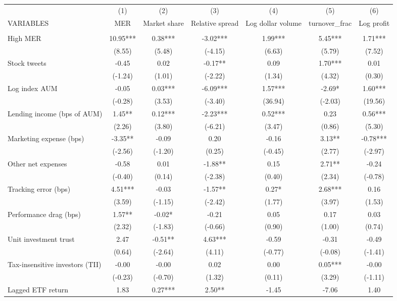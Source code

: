 \documentclass[]{article}
\begin{document}
\begin{tabular}{lcccccc} \hline
 & (1) & (2) & (3) & (4) & (5) & (6) \\
VARIABLES & MER & Market share & Relative spread & Log dollar volume & turnover\_frac & Log profit \\ \hline
 &  &  &  &  &  &  \\
High MER & 10.95*** & 0.38*** & -3.02*** & 1.99*** & 5.45*** & 1.71*** \\
 & (8.55) & (5.48) & (-4.15) & (6.63) & (5.79) & (7.52) \\
Stock tweets & -0.45 & 0.02 & -0.17** & 0.09 & 1.70*** & 0.01 \\
 & (-1.24) & (1.01) & (-2.22) & (1.34) & (4.32) & (0.30) \\
Log index AUM & -0.05 & 0.03*** & -6.09*** & 1.57*** & -2.69* & 1.60*** \\
 & (-0.28) & (3.53) & (-3.40) & (36.94) & (-2.03) & (19.56) \\
Lending income (bps of AUM) & 1.45** & 0.12*** & -2.23*** & 0.52*** & 0.23 & 0.56*** \\
 & (2.26) & (3.80) & (-6.21) & (3.47) & (0.86) & (5.30) \\
Marketing expense (bps) & -3.35** & -0.09 & 0.20 & -0.16 & 3.13** & -0.78*** \\
 & (-2.56) & (-1.20) & (0.25) & (-0.45) & (2.77) & (-2.97) \\
Other net expenses & -0.58 & 0.01 & -1.88** & 0.15 & 2.71** & -0.24 \\
 & (-0.40) & (0.14) & (-2.38) & (0.40) & (2.34) & (-0.78) \\
Tracking error (bps) & 4.51*** & -0.03 & -1.57** & 0.27* & 2.68*** & 0.16 \\
 & (3.59) & (-1.15) & (-2.42) & (1.77) & (3.97) & (1.53) \\
Performance drag (bps) & 1.57** & -0.02* & -0.21 & 0.05 & 0.17 & 0.03 \\
 & (2.32) & (-1.83) & (-0.66) & (0.90) & (1.00) & (0.74) \\
Unit investment trust & 2.47 & -0.51** & 4.63*** & -0.59 & -0.31 & -0.49 \\
 & (0.64) & (-2.64) & (4.11) & (-0.77) & (-0.08) & (-1.41) \\
Tax-insensitive investors (TII) & -0.00 & -0.00 & 0.02 & 0.00 & 0.05*** & -0.00 \\
 & (-0.23) & (-0.70) & (1.32) & (0.11) & (3.29) & (-1.11) \\
Lagged ETF return & 1.83 & 0.27*** & 2.50** & -1.45 & -7.06 & 1.40 \\

\end{tabular}
\end{document}
